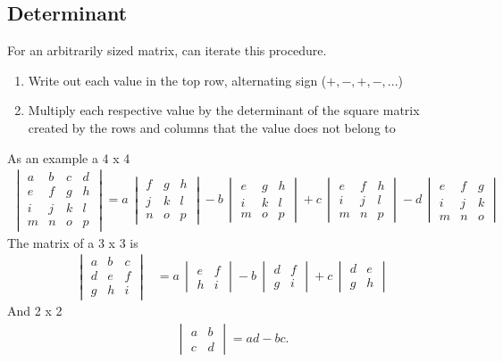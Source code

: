 \subsection{Determinant}
For an arbitrarily sized matrix, can iterate this procedure.
\begin{enumerate}
\item Write out each value in the top row, alternating sign ($+,-,+,-,...$)
\item Multiply each respective value by the determinant of the square matrix created by the rows and columns that the value does not belong to
\end{enumerate}
As an example a 4 x 4
\begin{align}
\begin{vmatrix} a & b & c & d\\e & f & g & h\\i & j & k & l\\m & n & o & p \end{vmatrix}=a\,\begin{vmatrix} f & g & h\\j & k & l\\n & o & p \end{vmatrix}-b\,\begin{vmatrix} e & g & h\\i & k & l\\m & o & p \end{vmatrix}+c\,\begin{vmatrix} e & f & h\\i & j & l\\m & n & p \end{vmatrix}-d\,\begin{vmatrix} e & f & g\\i & j & k\\m & n & o \end{vmatrix}
\end{align}
The matrix of a 3 x 3 is 
\begin{align}
 \begin{vmatrix} a & b & c\\d & e & f\\g & h & i \end{vmatrix} &= a\,\begin{vmatrix} e & f\\h & i \end{vmatrix} - b\,\begin{vmatrix} d & f\\g & i \end{vmatrix} + c\,\begin{vmatrix} d & e\\g & h \end{vmatrix}\end{align}
 And 2 x 2
 \begin{align}\begin{vmatrix} a & b\\c & d \end{vmatrix}=ad - bc .\end{align}



